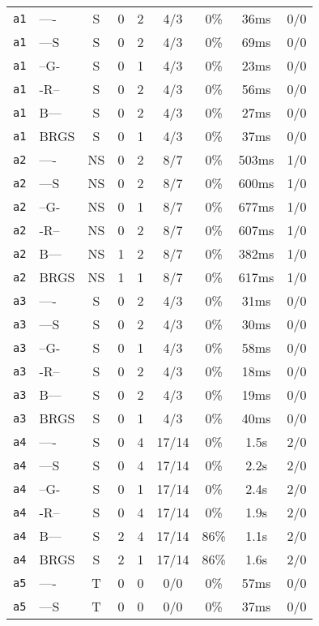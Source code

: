 \begin{tabular}{llccccccc}
\texttt{a1} & ---- & S & 0 & 2 & 4/3 & 0\% & 36ms & 0/0 \\
\texttt{a1} & ---S & S & 0 & 2 & 4/3 & 0\% & 69ms & 0/0 \\
\texttt{a1} & --G- & S & 0 & 1 & 4/3 & 0\% & 23ms & 0/0 \\
\texttt{a1} & -R-- & S & 0 & 2 & 4/3 & 0\% & 56ms & 0/0 \\
\texttt{a1} & B--- & S & 0 & 2 & 4/3 & 0\% & 27ms & 0/0 \\
\texttt{a1} & BRGS & S & 0 & 1 & 4/3 & 0\% & 37ms & 0/0 \\
\texttt{a2} & ---- & NS & 0 & 2 & 8/7 & 0\% & 503ms & 1/0 \\
\texttt{a2} & ---S & NS & 0 & 2 & 8/7 & 0\% & 600ms & 1/0 \\
\texttt{a2} & --G- & NS & 0 & 1 & 8/7 & 0\% & 677ms & 1/0 \\
\texttt{a2} & -R-- & NS & 0 & 2 & 8/7 & 0\% & 607ms & 1/0 \\
\texttt{a2} & B--- & NS & 1 & 2 & 8/7 & 0\% & 382ms & 1/0 \\
\texttt{a2} & BRGS & NS & 1 & 1 & 8/7 & 0\% & 617ms & 1/0 \\
\texttt{a3} & ---- & S & 0 & 2 & 4/3 & 0\% & 31ms & 0/0 \\
\texttt{a3} & ---S & S & 0 & 2 & 4/3 & 0\% & 30ms & 0/0 \\
\texttt{a3} & --G- & S & 0 & 1 & 4/3 & 0\% & 58ms & 0/0 \\
\texttt{a3} & -R-- & S & 0 & 2 & 4/3 & 0\% & 18ms & 0/0 \\
\texttt{a3} & B--- & S & 0 & 2 & 4/3 & 0\% & 19ms & 0/0 \\
\texttt{a3} & BRGS & S & 0 & 1 & 4/3 & 0\% & 40ms & 0/0 \\
\texttt{a4} & ---- & S & 0 & 4 & 17/14 & 0\% & 1.5s & 2/0 \\
\texttt{a4} & ---S & S & 0 & 4 & 17/14 & 0\% & 2.2s & 2/0 \\
\texttt{a4} & --G- & S & 0 & 1 & 17/14 & 0\% & 2.4s & 2/0 \\
\texttt{a4} & -R-- & S & 0 & 4 & 17/14 & 0\% & 1.9s & 2/0 \\
\texttt{a4} & B--- & S & 2 & 4 & 17/14 & 86\% & 1.1s & 2/0 \\
\texttt{a4} & BRGS & S & 2 & 1 & 17/14 & 86\% & 1.6s & 2/0 \\
\texttt{a5} & ---- & T & 0 & 0 & 0/0 & 0\% & 57ms & 0/0 \\
\texttt{a5} & ---S & T & 0 & 0 & 0/0 & 0\% & 37ms & 0/0 \\

\end{tabular}
